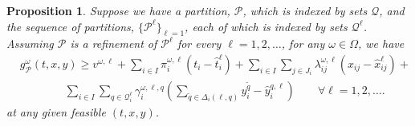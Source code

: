 \documentclass[11pt]{article}
\newtheorem{proposition}[theorem]{Proposition}
\begin{document}
	\begin{proposition} \label{prop:validity}
		Suppose we have a partition, \(\mathcal{P}\), which is indexed by sets \(\mathcal{Q}\), and the sequence of partitions, \(\{\mathcal{P}^\ell\}_{\ell = 1}\), each of which is indexed by sets \(\mathcal{Q}^\ell\). Assuming \(\mathcal{P}\) is a refinement of \(\mathcal{P}^\ell\) for every \(\ell = 1,2, \dots\), for any \(\omega \in \Omega\), we have
		\begin{align} \label{cons:validlb}
			&g^\omega_{\mathcal{P}}(t,x,y) \geq v^{\omega,\ell} + \sum_{i \in I} \pi_i^{\omega,\ell} (t_i - \hat{t}_i^{\ell}) + \sum_{i \in I} \sum_{j \in J_i} \lambda_{ij}^{\omega,\ell} (x_{ij} - \hat{x}_{ij}^{\ell}) + \nonumber \\ 
			& \qquad \qquad \sum_{i \in I} \sum_{q \in \mathcal{Q}^{\ell}_i} \gamma_{i}^{\omega,\ell,q} \left( \sum_{\tilde{q} \in \Delta_i(\ell,q)} y_i^{\tilde{q}} - \hat{y}_i^{q,\ell} \right) \qquad \forall \ell = 1,2, \dots. 
		\end{align}
		at any given feasible \((t,x,y)\).
	\end{proposition}
\end{document}
